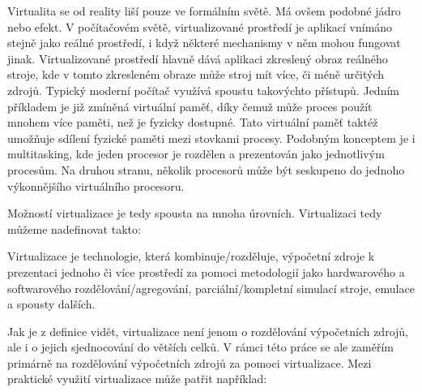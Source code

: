 Virtualita se od reality liší pouze ve formálním světě. Má ovšem podobné jádro nebo efekt. V počítačovém světě, virtualizované prostředí je aplikací vnímáno stejně jako reálné prostředí, i když některé mechanismy v něm mohou fungovat jinak. Virtualizované prostředí hlavně dává aplikaci zkreslený obraz reálného stroje, kde v tomto zkresleném obraze může stroj mít více, či méně určitých zdrojů. Typický moderní počítač využívá spoustu takovýchto přístupů. Jedním příkladem je již zmíněná virtuální paměť, díky čemuž může proces použít mnohem více paměti, než je fyzicky dostupné. Tato virtuální paměť taktéž umožňuje sdílení fyzické paměti mezi stovkami procesy. Podobným konceptem je i multitasking, kde jeden procesor je rozdělen a prezentován jako  jednotlivým procesům. Na druhou stranu, několik procesorů může být seskupeno do jednoho výkonnějšího virtuálního procesoru.

Možností virtualizace je tedy spousta na mnoha úrovních. Virtualizaci tedy můžeme nadefinovat takto:

\begin{displayquote}
    Virtualizace je technologie, která kombinuje/rozděluje, výpočetní zdroje k prezentaci jednoho či více prostředí za pomoci metodologií jako hardwarového a softwarového rozdělování/agregování, parciální/kompletní simulací stroje, emulace a spousty dalších.
\end{displayquote}

Jak je z definice vidět, virtualizace není jenom o rozdělování výpočetních zdrojů, ale i o jejich sjednocování do větších celků. V rámci této práce se ale zaměřím primárně na rozdělování výpočetních zdrojů za pomoci virtualizace. Mezi praktické využití virtualizace může patřit například:

